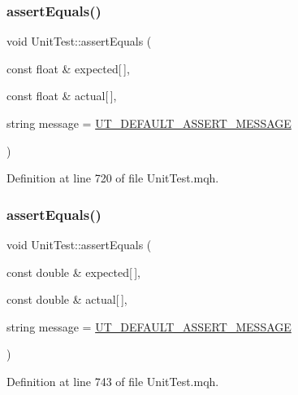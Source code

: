 \subsubsection{\texorpdfstring{assert\+Equals()}{assertEquals()}\hspace{0.1cm}{\footnotesize\ttfamily [24/28]}}
{\footnotesize\ttfamily void Unit\+Test\+::assert\+Equals (\begin{DoxyParamCaption}\item[{const float \&}]{expected\mbox{[}$\,$\mbox{]},  }\item[{const float \&}]{actual\mbox{[}$\,$\mbox{]},  }\item[{string}]{message = {\ttfamily \mbox{\hyperlink{_unit_test_8mqh_a96f5d62188d09039ebc3f443c9120e39}{U\+T\+\_\+\+D\+E\+F\+A\+U\+L\+T\+\_\+\+A\+S\+S\+E\+R\+T\+\_\+\+M\+E\+S\+S\+A\+GE}}} }\end{DoxyParamCaption})}



Definition at line 720 of file Unit\+Test.\+mqh.

\mbox{\label{class_unit_test_a8a2372a3622d8b6a271c69ad1635df9f}} 
\subsubsection{\texorpdfstring{assert\+Equals()}{assertEquals()}\hspace{0.1cm}{\footnotesize\ttfamily [25/28]}}
{\footnotesize\ttfamily void Unit\+Test\+::assert\+Equals (\begin{DoxyParamCaption}\item[{const double \&}]{expected\mbox{[}$\,$\mbox{]},  }\item[{const double \&}]{actual\mbox{[}$\,$\mbox{]},  }\item[{string}]{message = {\ttfamily \mbox{\hyperlink{_unit_test_8mqh_a96f5d62188d09039ebc3f443c9120e39}{U\+T\+\_\+\+D\+E\+F\+A\+U\+L\+T\+\_\+\+A\+S\+S\+E\+R\+T\+\_\+\+M\+E\+S\+S\+A\+GE}}} }\end{DoxyParamCaption})}



Definition at line 743 of file Unit\+Test.\+mqh.

\mbox{\label{class_unit_test_a1f7229215ccd9196d0f5837fc2f63757}} 
